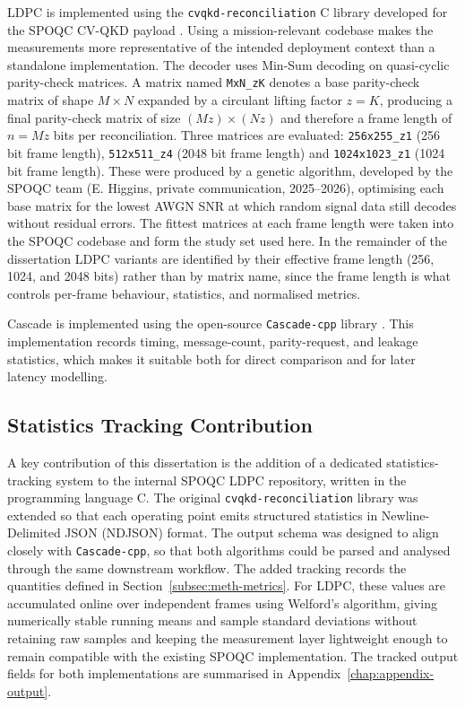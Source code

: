 \documentclass{UoYCSproject}
\begin{document}
LDPC is implemented using the \texttt{cvqkd-reconciliation} C library
developed for the SPOQC CV-QKD payload
\cite{noauthor_hubs_nodate, noauthor_uoy-researchcvqkd-reconciliation_nodate}. Using a
mission-relevant codebase makes the measurements more representative of the
intended deployment context than a standalone implementation. The decoder
uses Min-Sum decoding on quasi-cyclic parity-check matrices. A matrix named
\texttt{MxN\_zK} denotes a base parity-check matrix of shape $M \times N$
expanded by a circulant lifting factor $z = K$, producing a final
parity-check matrix of size $(Mz) \times (Nz)$ and therefore a frame length
of $n = Mz$ bits per reconciliation. Three matrices are evaluated: \texttt{256x255\_z1} (256 bit frame length), 
\texttt{512x511\_z4} (2048 bit frame length) and \texttt{1024x1023\_z1} 
(1024 bit frame length). These were produced by a genetic
algorithm, developed by the SPOQC team 
(E. Higgins, private communication, 2025--2026), optimising each base matrix for the lowest AWGN SNR at which
random signal data still decodes without residual errors. The
fittest matrices at each frame length were taken into the SPOQC codebase
and form the study set used here. In the remainder of the dissertation
LDPC variants are identified by their effective frame length (256, 1024,
and 2048 bits) rather than by matrix name, since the frame length is
what controls per-frame behaviour, statistics, and normalised metrics.

Cascade is implemented using the open-source \texttt{Cascade-cpp} library
\cite{rijsman_brunorijsmancascade-cpp_2026}. This implementation records
timing, message-count, parity-request, and leakage statistics, which makes
it suitable both for direct comparison and for later latency modelling.

\subsection{Statistics Tracking Contribution}
\label{subsec:meth-tracking}

A key contribution of this dissertation is the addition of a
dedicated statistics-tracking system to the internal SPOQC LDPC repository, written in the programming language C.
The original \texttt{cvqkd-reconciliation} library was extended so that each
operating point emits structured statistics in Newline-Delimited JSON
(NDJSON) format. The output schema was designed to align closely with
\texttt{Cascade-cpp}, so that both algorithms could be parsed and analysed
through the same downstream workflow. The added tracking records the
quantities defined in Section~\ref{subsec:meth-metrics}. For LDPC, these
values are accumulated online over independent frames using Welford's
algorithm, giving numerically stable running means and sample standard
deviations without retaining raw samples and keeping the measurement
layer lightweight enough to remain compatible with the existing SPOQC
implementation. The tracked output fields for both implementations are
summarised in Appendix~\ref{chap:appendix-output}.
\end{document}

